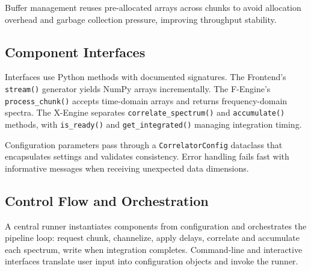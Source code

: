 Buffer management reuses pre-allocated arrays across chunks to avoid allocation overhead and garbage collection pressure, improving throughput stability.

\subsection{Component Interfaces}

Interfaces use Python methods with documented signatures. The Frontend's \texttt{stream()} generator yields NumPy arrays incrementally. The F-Engine's \texttt{process\_chunk()} accepts time-domain arrays and returns frequency-domain spectra. The X-Engine separates \texttt{correlate\_spectrum()} and \texttt{accumulate()} methods, with \texttt{is\_ready()} and \texttt{get\_integrated()} managing integration timing.

Configuration parameters pass through a \texttt{CorrelatorConfig} dataclass that encapsulates settings and validates consistency. Error handling fails fast with informative messages when receiving unexpected data dimensions.

\subsection{Control Flow and Orchestration}

A central runner instantiates components from configuration and orchestrates the pipeline loop: request chunk, channelize, apply delays, correlate and accumulate each spectrum, write when integration completes. Command-line and interactive interfaces translate user input into configuration objects and invoke the runner.
